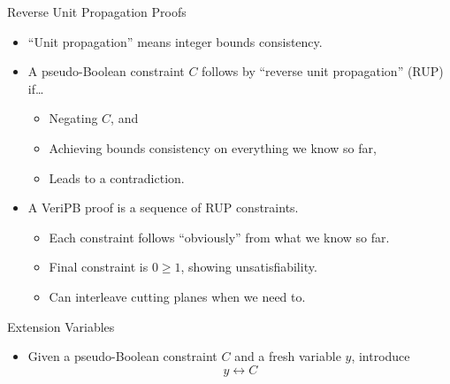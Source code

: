 \documentclass{beamer}
\begin{document}
\begin{frame}{Reverse Unit Propagation Proofs}
    \begin{itemize}
        \item ``Unit propagation'' means integer bounds consistency.
        \item A pseudo-Boolean constraint $C$ follows by ``reverse unit propagation'' (RUP) if\ldots
            \begin{itemize}
                \item Negating $C$, and
                \item Achieving bounds consistency on everything we know so far,
                \item Leads to a contradiction.
            \end{itemize}
        \item A VeriPB proof is a sequence of RUP constraints.
            \begin{itemize}
                \item Each constraint follows ``obviously'' from what we know so far.
                \item Final constraint is $0 \ge 1$, showing unsatisfiability.
                \item Can interleave cutting planes when we need to.
            \end{itemize}
    \end{itemize}
\end{frame}

\begin{frame}{Extension Variables}
    \begin{itemize}
        \item Given a pseudo-Boolean constraint $C$ and a fresh variable $y$, introduce
            \[ y \leftrightarrow C \]
    \end{itemize}
\end{frame}
\end{document}
